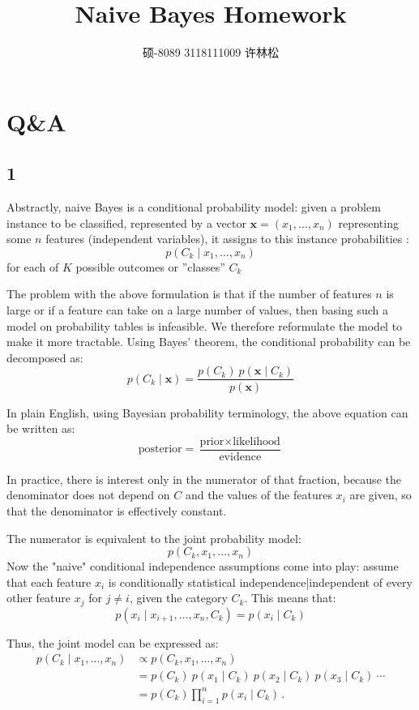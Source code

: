 \documentclass[letterpaper, 10 pt, conference]{ieeeconf}
\title{\LARGE \bf
Naive Bayes Homework
}
\author{硕-8089 3118111009 许林松%
}
\begin{document}
\maketitle
\thispagestyle{empty}
\pagestyle{empty}



\section{Q&A}


\subsection*{1}

Abstractly, naive Bayes is a conditional probability model: given a problem instance to be classified, represented by a vector $\mathbf{x} = (x_1, \dots, x_n)$ representing some $n$ features (independent variables), it assigns to this instance probabilities
:$$p(C_k \mid x_1, \dots, x_n)$$for each of $K$ possible outcomes or ''classes'' $C_k$

The problem with the above formulation is that if the number of features $n$ is large or if a feature can take on a large number of values, then basing such a model on probability tables is infeasible.  We therefore reformulate the model to make it more tractable.  Using Bayes' theorem, the conditional probability can be decomposed as:$$p(C_k \mid \mathbf{x}) = \frac{p(C_k) \ p(\mathbf{x} \mid C_k)}{p(\mathbf{x})}$$

In plain English, using Bayesian probability terminology, the above equation can be written as:$$\mbox{posterior} = \frac{\mbox{prior} \times \mbox{likelihood}}{\mbox{evidence}}$$

In practice, there is interest only in the numerator of that fraction, because the denominator does not depend on $C$ and the values of the features $x_i$ are given, so that the denominator is effectively constant.

The numerator is equivalent to the joint probability model:$$p(C_k, x_1, \dots, x_n)$$
Now the "naive" conditional independence assumptions come into play: assume that each feature $x_i$ is conditionally statistical independence|independent of every other feature $x_j$ for $j\neq i$, given the category $C_k$.  This means that:$$p(x_i \mid x_{i+1}, \dots ,x_{n}, C_k ) = p(x_i \mid C_k)$$

Thus, the joint model can be expressed as:
\begin{align*}
    p(C_k \mid x_1, \dots, x_n) & \propto p(C_k, x_1, \dots, x_n) \\
                            & = p(C_k) \ p(x_1 \mid C_k) \ p(x_2\mid C_k) \ p(x_3\mid C_k) \ \cdots \\
                            & = p(C_k) \prod_{i=1}^n p(x_i \mid C_k)\,.
\end{align*}
\end{document}
